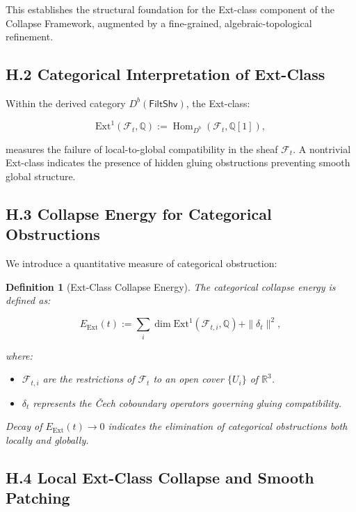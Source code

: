 \documentclass[11pt]{article}
\newtheorem{definition}[theorem]{Definition}
\begin{document}
This establishes the structural foundation for the Ext-class component of the Collapse Framework, augmented by a fine-grained, algebraic-topological refinement.

\subsection*{H.2 Categorical Interpretation of Ext-Class}

Within the derived category \( D^b(\mathsf{FiltShv}) \), the Ext-class:

\[
\mathrm{Ext}^1(\mathcal{F}_t, \mathbb{Q}) := \operatorname{Hom}_{D^b}(\mathcal{F}_t, \mathbb{Q}[1]),
\]

measures the failure of local-to-global compatibility in the sheaf \( \mathcal{F}_t \).  
A nontrivial Ext-class indicates the presence of hidden gluing obstructions preventing smooth global structure.

\subsection*{H.3 Collapse Energy for Categorical Obstructions}

We introduce a quantitative measure of categorical obstruction:

\begin{definition}[Ext-Class Collapse Energy]
The categorical collapse energy is defined as:

\[
E_{\mathrm{Ext}}(t) := \sum_i \dim \mathrm{Ext}^1(\mathcal{F}_{t, i}, \mathbb{Q}) + \| \delta_t \|^2,
\]

where:

\begin{itemize}
  \item \( \mathcal{F}_{t, i} \) are the restrictions of \( \mathcal{F}_t \) to an open cover \( \{ U_i \} \) of \( \mathbb{R}^3 \).
  \item \( \delta_t \) represents the Čech coboundary operators governing gluing compatibility.
\end{itemize}

Decay of \( E_{\mathrm{Ext}}(t) \to 0 \) indicates the elimination of categorical obstructions both locally and globally.
\end{definition}

\subsection*{H.4 Local Ext-Class Collapse and Smooth Patching}
\end{document}
